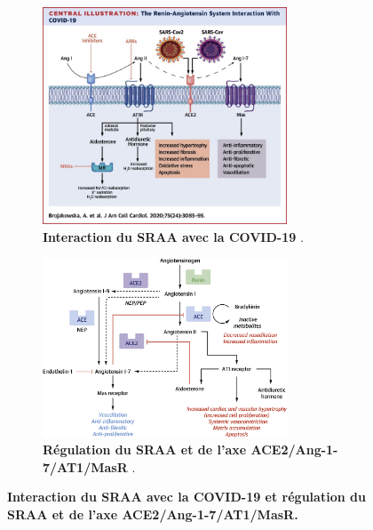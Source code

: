 \documentclass[
  a4paper,
  DIV=11,
  numbers=noendperiod,
  listof=totoc]{scrreprt}
\begin{document}
\begin{figure}[!htbp]
    \centering
    \begin{subfigure}
        {\textwidth}
        \centering
        \includegraphics[width=0.8\textwidth]{figures/Brojakowska-RAS-COVID-19.jpg}
        \caption{\textbf{Interaction du SRAA avec la COVID-19} \autocite{Brojakowska.2020}.}
        \label{fig-sraa-covid19}
    \end{subfigure}

    \bigskip

    \begin{subfigure}
        {\textwidth}
        \centering
        \includegraphics[width=0.8\textwidth]{
            figures/Brojakowska-RAS-ACE2-Regulation.jpg
        }
        \caption{\textbf{Régulation du SRAA et de l'axe ACE2/Ang-1-7/AT1/MasR} \autocite{Brojakowska.2020}.}
        \label{fig-ace2-masR}
    \end{subfigure}
    \caption[Interaction du SRAA avec la COVID-19 et régulation du SRAA et de l'axe
    ACE2/Ang-1-7/AT1/MasR.]{\textbf{Interaction du SRAA avec la COVID-19 et
    régulation du SRAA et de l'axe ACE2/Ang-1-7/AT1/MasR.}}
\end{figure}
\end{document}

